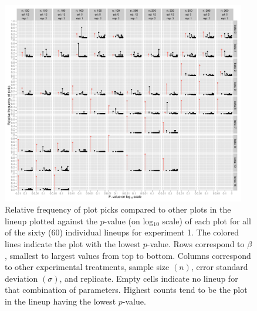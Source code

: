 \documentclass{article}
\newcommand{\green}[1]{{\color{green} #1}} %
\begin{document}

\begin{figure}[hbtp]
   \centering
       \includegraphics[width=0.95\textwidth]{p_val_log_counts.pdf}
       \caption{Relative frequency of plot picks compared to other plots in the lineup plotted against the $p$-value (on log$_{10}$ scale) of each plot for all of the sixty (60) individual lineups for experiment 1. The colored lines indicate the plot with the lowest $p$-value. Rows correspond to $\beta$, smallest to largest values from top to bottom. Columns correspond to other experimental treatments, sample size $(n)$, error standard deviation $(\sigma)$, and replicate. Empty cells indicate no lineup for that combination of parameters. Highest counts tend to be the plot in the lineup having the lowest $p$-value.}
       \label{fig:P-val_log}
\end{figure}
\end{document}
